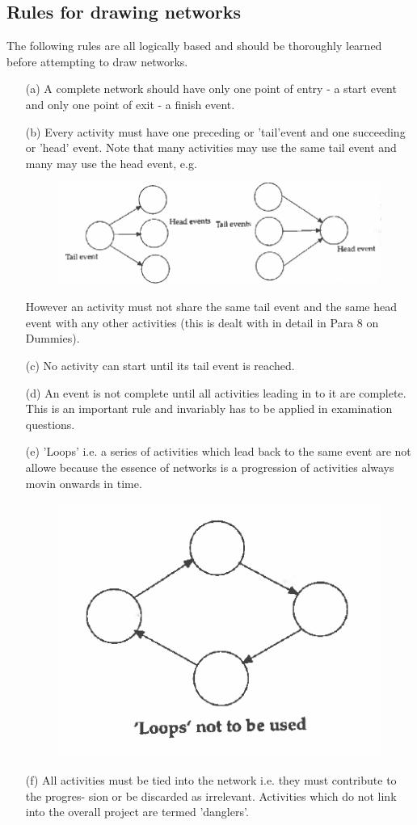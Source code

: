 \documentclass[]{report}
\begin{document}
\subsection*{Rules for drawing networks}
 The following rules are all logically based and should be thoroughly learned before attempting to draw networks. 
\begin{itemize}
\item[(a)] 
A complete network should have only one point of entry - a start event and only one point of exit - a finish event. 
\item[(b)]  Every activity must have one preceding or 'tail'event and one succeeding or 'head' event. Note that many activities may use the same tail event and many may use the head event, e.g. 


\begin{figure}[h!]
\centering
\includegraphics[width=0.4\linewidth]{324-b}
\caption{}
\label{fig:324-b}
\end{figure}


However an activity must not share the same tail event and the same head event with any other activities (this is dealt with in detail in Para 8 on Dummies). 
	\item[(c)]  No activity can start until its tail event is reached.	\item[(d)] An event is not complete until all activities leading in to it are complete. 
This is an important rule and invariably has to be applied in examination questions. 	\item[(e)]  'Loops' i.e. a series of activities which lead back to the same event 
are not allowe because the essence of networks is a progression of activities always movin onwards in time. 

\begin{figure}[h!]
\centering
\includegraphics[width=0.3\linewidth]{324-c}
\caption{}
\label{fig:324-c}
\end{figure}
 \newpage




	\item[(f)]  All activities must be tied into the network i.e. they must contribute to the progres-
sion or be discarded as irrelevant. Activities which do not link into the overall project 
are termed 'danglers'. 
\end{itemize}
\end{document}
